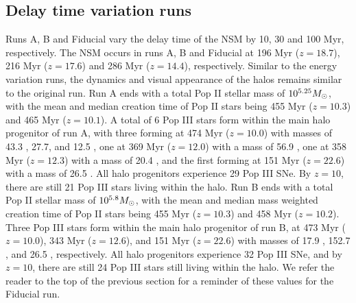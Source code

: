 \documentclass[fleqn,usenatbib]{mnras}
\begin{document}
\textbf{}

\subsection{Delay time variation runs} \label{sec:time_vary}

Runs A, B and Fiducial vary the delay time of the NSM by 10, 30 and 100 Myr, respectively. The NSM occurs in runs A, B and Fiducial at 196 Myr ($z = 18.7$), 216 Myr ($z = 17.6$) and 286 Myr ($z = 14.4$), respectively. Similar to the energy variation runs, the dynamics and visual appearance of the halos remains similar to the original run. Run A ends with a total Pop II stellar mass of $10^{5.25} \Ms$, with the mean and median creation time of Pop II stars being 455 Myr ($z = 10.3$) and 465 Myr ($z = 10.1$). A total of 6 Pop III stars form within the main halo progenitor of run A, with three forming at 474 Myr ($z = 10.0$) with masses of 43.3 \Ms{}, 27.7\Ms{}, and 12.5 \Ms{}, one at 369 Myr ($z = 12.0$) with a mass of 56.9 \Ms, one at 358 Myr ($z = 12.3$) with a mass of 20.4 \Ms{}, and the first forming at 151 Myr ($z = 22.6$) with a mass of 26.5 \Ms. All halo progenitors experience 29 Pop III SNe. By $z = 10$, there are still 21 Pop III stars living within the halo. Run B ends with a total Pop II stellar mass of $10^{5.8} \Ms$, with the mean and median mass weighted creation time of Pop II stars being 455 Myr ($z = 10.3$) and 458 Myr ($z = 10.2$). Three Pop III stars form within the main halo progenitor of run B, at 473 Myr ($z = 10.0$), 343 Myr ($z = 12.6$), and 151 Myr ($z = 22.6$) with masses of 17.9 \Ms{}, 152.7 \Ms{}, and 26.5 \Ms{}, respectively. All halo progenitors experience 32 Pop III SNe, and by $z = 10$, there are still 24 Pop III stars still living within the halo. We refer the reader to the top of the previous section for a reminder of these values for the Fiducial run. 
\end{document}
